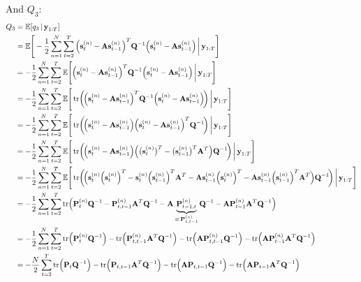 	And \(Q_3\):
	\begin{align*}
		Q_3
			&= \E[q_3 \given \vec{y}_{1:T}] \\
			&= \E\Bigg[ -\frac{1}{2} \sum_{n = 1}^{N} \sum_{t = 2}^{T} \Big( \vec{s}_t^{(n)} - \mat{A} \vec{s}_{t - 1}^{(n)} \Big)^T \mat{Q}^{-1} \Big( \vec{s}_t^{(n)} - \mat{A} \vec{s}_{t - 1}^{(n)} \Big) \bigggiven \vec{y}_{1:T} \Bigg] \\
			&= -\frac{1}{2} \sum_{n = 1}^{N} \sum_{t = 2}^{T} \E\Bigg[ \Big( \vec{s}_t^{(n)} - \mat{A} \vec{s}_{t - 1}^{(n)} \Big)^T \mat{Q}^{-1} \Big( \vec{s}_t^{(n)} - \mat{A} \vec{s}_{t - 1}^{(n)} \Big) \bigggiven \vec{y}_{1:T} \Bigg] \\
			&= -\frac{1}{2} \sum_{n = 1}^{N} \sum_{t = 2}^{T} \E\Bigg[ \tr\!\bigg(\!\Big( \vec{s}_t^{(n)} - \mat{A} \vec{s}_{t - 1}^{(n)} \Big)^T \mat{Q}^{-1} \Big( \vec{s}_t^{(n)} - \mat{A} \vec{s}_{t - 1}^{(n)} \Big)\!\bigg) \bigggiven \vec{y}_{1:T} \Bigg] \\
			&= -\frac{1}{2} \sum_{n = 1}^{N} \sum_{t = 2}^{T} \E\Bigg[ \tr\!\bigg(\!\Big( \vec{s}_t^{(n)} - \mat{A} \vec{s}_{t - 1}^{(n)} \Big) \Big( \vec{s}_t^{(n)} - \mat{A} \vec{s}_{t - 1}^{(n)} \Big)^T \mat{Q}^{-1} \!\bigg) \bigggiven \vec{y}_{1:T} \Bigg] \\
			&= -\frac{1}{2} \sum_{n = 1}^{N} \sum_{t = 2}^{T} \E\Bigg[ \tr\!\bigg(\!\Big( \vec{s}_t^{(n)} - \mat{A} \vec{s}_{t - 1}^{(n)} \Big) \Big(\big(\vec{s}_t^{(n)}\big)^T - \big(\vec{s}_{t - 1}^{(n)}\big)^T \mat{A}^T \Big) \mat{Q}^{-1} \!\bigg) \bigggiven \vec{y}_{1:T} \Bigg] \\
			&= -\frac{1}{2} \sum_{n = 1}^{N} \sum_{t = 2}^{T} \E\Bigg[ \tr\!\bigg(\!\Big( \vec{s}_t^{(n)} \Big(\vec{s}_t^{(n)}\Big)^T - \vec{s}_t^{(n)} \Big(\vec{s}_{t - 1}^{(n)}\Big)^T \mat{A}^T - \mat{A} \vec{s}_{t - 1}^{(n)} \Big(\vec{s}_t^{(n)}\Big)^T - \mat{A} \vec{s}_{t - 1}^{(n)} \Big(\vec{s}_{t - 1}^{(n)}\Big)^T \mat{A}^T \Big) \mat{Q}^{-1} \!\bigg) \bigggiven \vec{y}_{1:T} \Bigg] \\
			&= -\frac{1}{2} \sum_{n = 1}^{N} \sum_{t = 2}^{T} \tr\!\Big( \mat{P}_t^{(n)} \mat{Q}^{-1} - \mat{P}_{t, t - 1}^{(n)} \mat{A}^T \mat{Q}^{-1} - \mat{A} \underbrace{\mat{P}_{t - 1, t}^{(n)}}_{=\, \mat{P}_{t, t - 1}^{(n)}} \mat{Q}^{-1} - \mat{A} \mat{P}_{t - 1}^{(n)} \mat{A}^T \mat{Q}^{-1} \Big) \\
			&= -\frac{1}{2} \sum_{n = 1}^{N} \sum_{t = 2}^{T} \tr\!\Big( \mat{P}_t^{(n)} \mat{Q}^{-1} \Big) - \tr\!\Big( \mat{P}_{t, t - 1}^{(n)} \mat{A}^T \mat{Q}^{-1} \Big) - \tr\!\Big( \mat{A} \mat{P}_{t, t - 1}^{(n)} \mat{Q}^{-1} \Big) - \tr\!\Big( \mat{A} \mat{P}_{t - 1}^{(n)} \mat{A}^T \mat{Q}^{-1} \Big) \\
			&= -\frac{N}{2} \sum_{t = 2}^{T} \tr\!\Big( \mat{P}_t \mat{Q}^{-1} \Big) - \tr\!\Big( \mat{P}_{t, t - 1} \mat{A}^T \mat{Q}^{-1} \Big) - \tr\!\Big( \mat{A} \mat{P}_{t, t - 1} \mat{Q}^{-1} \Big) - \tr\!\Big( \mat{A} \mat{P}_{t - 1} \mat{A}^T \mat{Q}^{-1} \Big)
	\end{align*}
